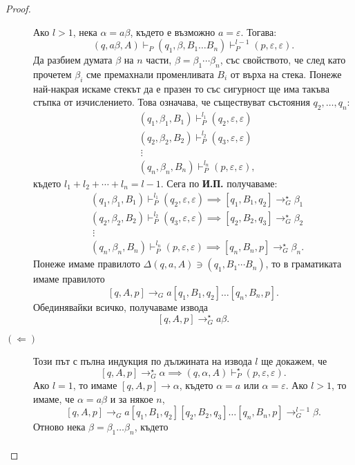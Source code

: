 \begin{proof}
\begin{description}
    Ако $l > 1$, нека $\alpha = a\beta$, където е възможно $a = \varepsilon$. Тогава:
    \[(q,a\beta,A) \vdash_P (q_1,\beta,B_1\dots B_n) \vdash^{l-1}_P (p, \varepsilon, \varepsilon).\]
    Да разбием думата $\beta$ на $n$ части, $\beta = \beta_1\cdots \beta_n$, със свойството, че след като прочетем $\beta_i$ 
    сме премахнали променливата $B_i$ от върха на стека.
    Понеже най-накрая искаме стекът да е празен то със сигурност ще има такъва стъпка от изчислението.
    Това означава, че съществуват състояния $q_2,\dots,q_{n}$:
    \begin{align*}
      & (q_1, \beta_1, B_1) \vdash^{l_1}_P (q_{2},\varepsilon,\varepsilon)\\
      & (q_2, \beta_2, B_2) \vdash^{l_2}_P (q_{3},\varepsilon,\varepsilon)\\
      & \ \vdots\\
      & (q_n, \beta_n, B_n) \vdash^{l_n}_P (p,\varepsilon,\varepsilon),
    \end{align*}
    където $l_1+l_2+\cdots+l_n = l-1$.
    Сега по {\bf И.П.} получаваме:
    \begin{align*}
      & (q_1, \beta_1, B_1) \vdash^{l_1}_P (q_{2},\varepsilon,\varepsilon) \implies [q_1,B_1, q_{2}] \to^\star_G \beta_1\\
      & (q_2, \beta_2, B_2) \vdash^{l_2}_P (q_{3},\varepsilon,\varepsilon) \implies [q_2,B_2, q_{3}] \to^\star_G \beta_2\\
      & \ \vdots\\
      & (q_n, \beta_n, B_n) \vdash^{l_n}_P (p,\varepsilon,\varepsilon) \implies [q_n,B_n, p] \to^\star_G \beta_n.
    \end{align*}
    Понеже имаме правилото $\Delta(q,a,A) \ni (q_1,B_1\cdots B_n)$, то в граматиката имаме правилото
    \[[q,A,p] \rightarrow_G a[q_1,B_1,q_2]\dots[q_n,B_n,p].\]
    Обединявайки всичко, получаваме извода
    \[[q,A,p] \rightarrow^\star_G a\beta.\]
  \item[$(\Leftarrow)$]
    Този път с пълна индукция по дължината на извода $l$ ще докажем, че
    \[[q,A,p] \rightarrow^\star_G \alpha \implies (q,\alpha,A) \vdash^\star_P (p,\varepsilon,\varepsilon).\]
    Ако $l = 1$, то имаме $[q,A,p] \rightarrow \alpha$, където $\alpha = a$ или $\alpha = \varepsilon$.
    Ако $l > 1$, то имаме, че $\alpha = a\beta$ и за някое $n$, 
    \[[q,A,p] \rightarrow_G a[q_1,B_1,q_2][q_2,B_2,q_3]\dots[q_n,B_n,p] \rightarrow^{l-1}_G \beta.\]
    Отново нека $\beta = \beta_1\dots \beta_n$, където 
    \begin{align*}

\end{align*}
\end{description}
\end{proof}
